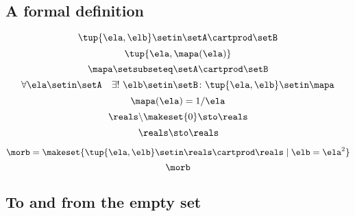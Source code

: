 {\begin{forslides}
    \subsection{A formal definition}

    \begin{equation}
        \label{eq:slides_session2_107}
        \tup{\ela, \elb} \setin\setA \cartprod \setB
    \end{equation}
    \begin{equation}
        \label{eq:slides_session2_108}
        \tup{\ela, \mapa(\ela)}
    \end{equation}
    \begin{equation}
        \label{eq:slides_session2_109}
        \mapa \setsubseteq \setA \cartprod \setB
    \end{equation}
    \begin{equation}
        \label{eq:slides_session2_110}
        \forall \ela \setin\setA  \quad  \exists !
        \ \elb \setin\setB \colon \tup{\ela,\elb} \setin\mapa
    \end{equation}
    \begin{equation}
        \label{eq:slides_session2_111}
        \mapa(\ela) = 1/ \ela
    \end{equation}
    \begin{equation}
        \label{eq:slides_session2_112}
        \reals \backslash \makeset{ 0 } \sto \reals
    \end{equation}
    \begin{equation}
        \label{eq:slides_session2_113}
        \reals \sto \reals
    \end{equation}

    \begin{equation}
        \label{eq:slides_session2_113a}
        \morb = \makeset{\tup{\ela, \elb} \setin \reals \cartprod \reals \mid \elb = \ela^2}
    \end{equation}
    \begin{equation}
        \label{eq:slides_session2_113b}
        \morb
    \end{equation}

    \subsection{To and from the empty set}


\end{forslides}}
